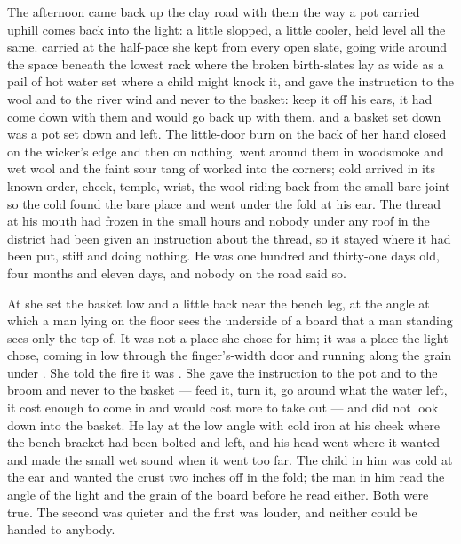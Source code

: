 The afternoon came back up the clay road with them the way a pot carried uphill comes back into the light: a little slopped, a little cooler, held level all the same.  carried  at the half-pace she kept from every open slate, going wide around the space beneath the lowest rack where the broken birth-slates lay as wide as a pail of hot water set where a child might knock it, and gave the instruction to the wool and to the river wind and never to the basket: keep it off his ears, it had come down with them and would go back up with them, and a basket set down was a pot set down and left. The little-door burn on the back of her hand closed on the wicker's edge and then on nothing.  went around them in woodsmoke and wet wool and the faint sour tang of  worked into the corners; cold arrived in its known order, cheek, temple, wrist, the wool riding back from the small bare joint so the cold found the bare place and went under the fold at his ear. The thread at his mouth had frozen in the small hours and nobody under any roof in the district had been given an instruction about the thread, so it stayed where it had been put, stiff and doing nothing. He was one hundred and thirty-one days old, four months and eleven days, and nobody on the road said so.

At  she set the basket low and a little back near the bench leg, at the angle at which a man lying on the floor sees the underside of a board that a man standing sees only the top of. It was not a place she chose for him; it was a place the light chose, coming in low through the finger's-width door and running along the grain under . She told the fire it was . She gave the instruction to the pot and to the broom and never to the basket --- feed it, turn it, go around what the water left, it cost enough to come in and would cost more to take out --- and did not look down into the basket. He lay at the low angle with cold iron at his cheek where the bench bracket had been bolted and left, and his head went where it wanted and made the small wet sound when it went too far. The child in him was cold at the ear and wanted the crust two inches off in the fold; the man in him read the angle of the light and the grain of the board before he read either. Both were true. The second was quieter and the first was louder, and neither could be handed to anybody.

